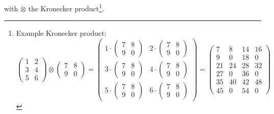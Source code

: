 with $\otimes$ the Kronecker product\footnote{Example Kronecker product:
\begin{equation}
    \left(\begin{array}{ll}
    1 & 2 \\
    3 & 4 \\
    5 & 6
    \end{array}\right) \otimes\left(\begin{array}{ll}
    7 & 8 \\
    9 & 0
    \end{array}\right)=\left(\begin{array}{cc}
    1 \cdot\left(\begin{array}{ll}
    7 & 8 \\
    9 & 0
    \end{array}\right) & 2 \cdot\left(\begin{array}{ll}
    7 & 8 \\
    9 & 0
    \end{array}\right) \\
    3 \cdot\left(\begin{array}{ll}
    7 & 8 \\
    9 & 0
    \end{array}\right) & 4 \cdot\left(\begin{array}{ll}
    7 & 8 \\
    9 & 0
    \end{array}\right) \\
    5 \cdot\left(\begin{array}{ll}
    7 & 8 \\
    9 & 0
    \end{array}\right) & 6 \cdot\left(\begin{array}{ll}
    7 & 8 \\
    9 & 0
    \end{array}\right)
    \end{array}\right)=\left(\begin{array}{cccc}
    7 & 8 & 14 & 16 \\
    9 & 0 & 18 & 0 \\
    21 & 24 & 28 & 32 \\
    27 & 0 & 36 & 0 \\
    35 & 40 & 42 & 48 \\
    45 & 0 & 54 & 0
    \end{array}\right)
    \end{equation}
}.


